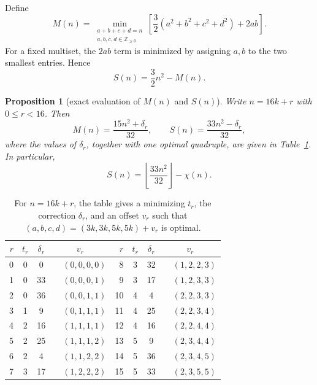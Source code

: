 \documentclass[11pt]{article}
\theoremstyle{plain}
\newtheorem{proposition}[theorem]{Proposition}
\theoremstyle{definition}
\theoremstyle{remark}
\newcommand{\1}{\mathbf 1}
\begin{document}
Define
\begin{equation}\label{eq:Mdef}
 M(n)=\min_{\substack{a+b+c+d=n\\a,b,c,d\in\mathbb Z_{\geq0}}}
 \left[\frac32(a^2+b^2+c^2+d^2)+2ab\right].
\end{equation}
For a fixed multiset, the $2ab$ term is minimized by assigning $a,b$ to the
two smallest entries.  Hence
\begin{equation}\label{eq:SM}
 S(n)=\frac32n^2-M(n).
\end{equation}

\begin{proposition}[exact evaluation of $M(n)$ and $S(n)$]\label{prop:exactS}
Write $n=16k+r$ with $0\leq r<16$.  Then
\begin{equation}\label{eq:Mclosed}
 M(n)=\frac{15n^2+\delta_r}{32},\qquad
 S(n)=\frac{33n^2-\delta_r}{32},
\end{equation}
where the values of $\delta_r$, together with one optimal quadruple, are
given in Table~\ref{tab:residues}.  In particular,
\[
 S(n)=\left\lfloor\frac{33n^2}{32}\right\rfloor-\chi(n).
\]
\end{proposition}

\begin{table}[ht]
\centering
\small
\caption{For $n=16k+r$, the table gives a minimizing $t_r$, the correction
$\delta_r$, and an offset $v_r$ such that
$(a,b,c,d)=(3k,3k,5k,5k)+v_r$ is optimal.}
\label{tab:residues}
\begin{tabular}{@{}rcccl@{\qquad}rcccl@{}}
\toprule
$r$&$t_r$&$\delta_r$&\multicolumn{2}{c}{$v_r$}
&$r$&$t_r$&$\delta_r$&\multicolumn{2}{c}{$v_r$}\\
\midrule
0&0&0&&$(0,0,0,0)$ & 8&3&32&&$(1,2,2,3)$\\
1&0&33&&$(0,0,0,1)$& 9&3&17&&$(1,2,3,3)$\\
2&0&36&&$(0,0,1,1)$&10&4&4&&$(2,2,3,3)$\\
3&1&9&&$(0,1,1,1)$&11&4&25&&$(2,2,3,4)$\\
4&2&16&&$(1,1,1,1)$&12&4&16&&$(2,2,4,4)$\\
5&2&25&&$(1,1,1,2)$&13&5&9&&$(2,3,4,4)$\\
6&2&4&&$(1,1,2,2)$&14&5&36&&$(2,3,4,5)$\\
7&3&17&&$(1,2,2,2)$&15&5&33&&$(2,3,5,5)$\\
\bottomrule
\end{tabular}
\end{table}
\end{document}
